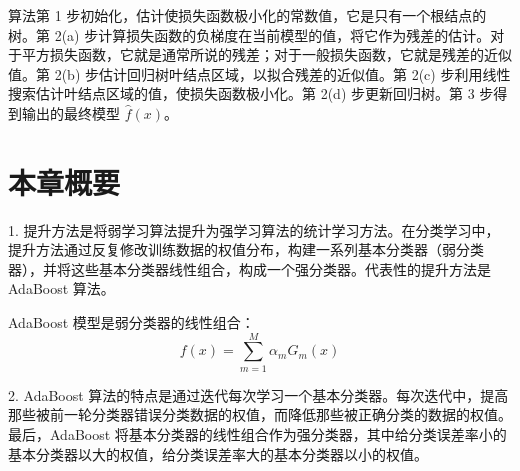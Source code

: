 \documentclass[UTF8,12pt,a4paper,fontset=fandol]{ctexart}
\begin{document}
\begin{center}
\end{center}

算法第 1 步初始化，估计使损失函数极小化的常数值，它是只有一个根结点的树。第 2(a) 步计算损失函数的负梯度在当前模型的值，将它作为残差的估计。对于平方损失函数，它就是通常所说的残差；对于一般损失函数，它就是残差的近似值。第 2(b) 步估计回归树叶结点区域，以拟合残差的近似值。第 2(c) 步利用线性搜索估计叶结点区域的值，使损失函数极小化。第 2(d) 步更新回归树。第 3 步得到输出的最终模型 $\hat{f}(x)$。

\section*{本章概要}

1. 提升方法是将弱学习算法提升为强学习算法的统计学习方法。在分类学习中，提升方法通过反复修改训练数据的权值分布，构建一系列基本分类器（弱分类器），并将这些基本分类器线性组合，构成一个强分类器。代表性的提升方法是 AdaBoost 算法。

AdaBoost 模型是弱分类器的线性组合：
\[
f(x)=\sum_{m=1}^M \alpha_mG_m(x)
\]

2. AdaBoost 算法的特点是通过迭代每次学习一个基本分类器。每次迭代中，提高那些被前一轮分类器错误分类数据的权值，而降低那些被正确分类的数据的权值。最后，AdaBoost 将基本分类器的线性组合作为强分类器，其中给分类误差率小的基本分类器以大的权值，给分类误差率大的基本分类器以小的权值。
\end{document}
